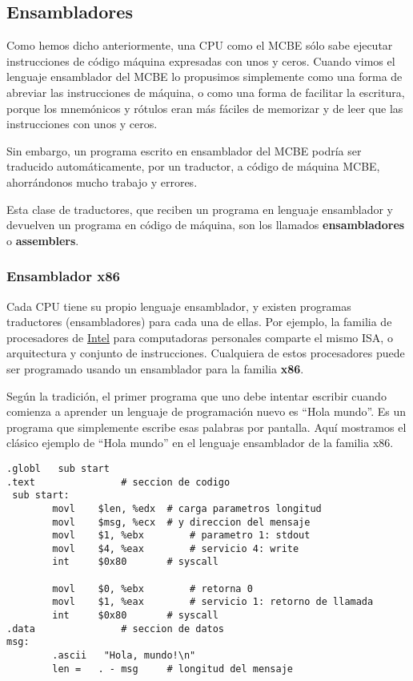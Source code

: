 \documentclass[spanish,A4,]{article}
\begin{document}
\subsection{Ensambladores}\label{ensambladores}

Como hemos dicho anteriormente, una CPU como el MCBE sólo sabe ejecutar
instrucciones de código máquina expresadas con unos y ceros. Cuando
vimos el lenguaje ensamblador del MCBE lo propusimos simplemente como
una forma de abreviar las instrucciones de máquina, o como una forma de
facilitar la escritura, porque los mnemónicos y rótulos eran más fáciles
de memorizar y de leer que las instrucciones con unos y ceros.

Sin embargo, un programa escrito en ensamblador del MCBE podría ser
traducido automáticamente, por un traductor, a código de máquina MCBE,
ahorrándonos mucho trabajo y errores.

Esta clase de traductores, que reciben un programa en lenguaje
ensamblador y devuelven un programa en código de máquina, son los
llamados \textbf{ensambladores} o \textbf{assemblers}.

\subsubsection{Ensamblador x86}\label{ensamblador-x86}

Cada CPU tiene su propio lenguaje ensamblador, y existen programas
traductores (ensambladores) para cada una de ellas. Por ejemplo, la
familia de procesadores de
\href{https://es.m.wikipedia.org/wiki/Intel sub Corporation}{Intel} para
computadoras personales comparte el mismo ISA, o arquitectura y conjunto
de instrucciones. Cualquiera de estos procesadores puede ser programado
usando un ensamblador para la familia \textbf{x86}.

Según la tradición, el primer programa que uno debe intentar escribir
cuando comienza a aprender un lenguaje de programación nuevo es ``Hola
mundo''. Es un programa que simplemente escribe esas palabras por
pantalla. Aquí mostramos el clásico ejemplo de ``Hola mundo'' en el
lenguaje ensamblador de la familia x86.

\begin{verbatim}
.globl   sub start
.text               # seccion de codigo
 sub start:
        movl    $len, %edx  # carga parametros longitud
        movl    $msg, %ecx  # y direccion del mensaje
        movl    $1, %ebx        # parametro 1: stdout
        movl    $4, %eax        # servicio 4: write
        int     $0x80       # syscall

        movl    $0, %ebx        # retorna 0
        movl    $1, %eax        # servicio 1: retorno de llamada
        int     $0x80       # syscall
.data               # seccion de datos
msg:
        .ascii   "Hola, mundo!\n"
        len =   . - msg     # longitud del mensaje
\end{verbatim}
\end{document}
